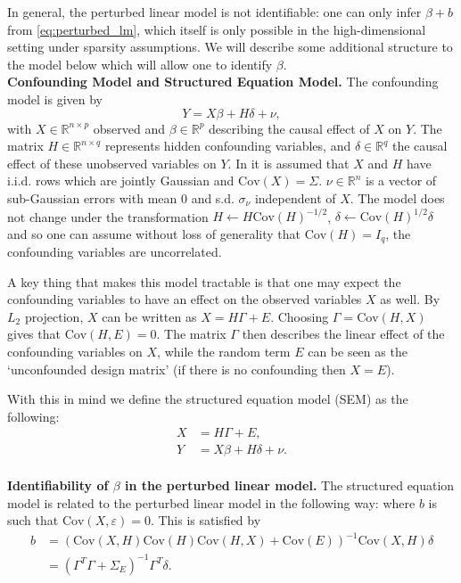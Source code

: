 \documentclass[11pt]{article}
\newcommand{\subparspace}{\vspace{3mm} \\}
\newcommand{\eps}{\varepsilon}
\newcommand{\R}{\mathbb{R}}
\newcommand{\cov}{\textrm{Cov}}
\numberwithin{equation}{section}
\begin{document}
In general, the perturbed linear model is not identifiable: one can only infer $\beta + b$ from \eqref{eq:perturbed_lm}, which itself is only possible in the high-dimensional setting under sparsity assumptions. We will describe some additional structure to the model below which will allow one to identify $\beta$.
\subparspace
{\bf Confounding Model and Structured Equation Model. }
The confounding model is given by
\begin{equation}
	Y = X\beta + H \delta + \nu,
\end{equation}
with $X \in \R^{n \times p}$ observed and $\beta \in \R^p$ describing the causal effect of $X$ on $Y$. The matrix $H \in \R^{n \times q}$ represents hidden confounding variables, and $\delta \in \R^q$ the causal effect of these unobserved variables on $Y$. In \cite{CBM2020} it is assumed that {\color{assumption} $X$ and $H$ have i.i.d. rows which are jointly Gaussian and $\cov(X) = \Sigma$. $\nu \in \R^n$ is a vector of sub-Gaussian errors with mean 0 and s.d. $\sigma_\nu$ independent of $X$}. The model does not change under the transformation $H \leftarrow H \cov(H)^{-1/2}$, $\delta \leftarrow \cov(H)^{1/2} \delta$ and so one can assume without loss of generality that {\color{assumption} $\cov(H) = I_q$, the confounding variables are uncorrelated}.

A key thing that makes this model tractable is that one may expect the confounding variables to have an effect on the observed variables $X$ as well. By $L_2$ projection, $X$ can be written as $X = H \Gamma + E$. Choosing $\Gamma = \cov(H, X)$ gives that $\cov(H, E) = 0$. The matrix $\Gamma$ then describes the linear effect of the confounding variables on $X$, while the random term $E$ can be seen as the `unconfounded design matrix' (if there is no confounding then $X = E$). 

With this in mind we define the structured equation model (SEM) as the following:
\begin{align}
	X &= H \Gamma + E, \nonumber\\
	Y &= X \beta + H \delta + \nu. \label{eq:SEM}
\end{align}
\subparspace
{\bf Identifiability of $\beta$ in the perturbed linear model. }
The structured equation model is related to the perturbed linear model in the following way:
where $b$ is such that $\cov(X, \eps) = 0$. This is satisfied by
\begin{align}
b &= (\cov(X,H) \cov(H) \cov(H, X) + \cov(E))^{-1}\cov(X, H)\delta \label{eq:b_relation_confounding}\\
&=	(\Gamma^T\Gamma + \Sigma_E)^{-1}\Gamma^T \delta. \nonumber
\end{align}
\end{document}
